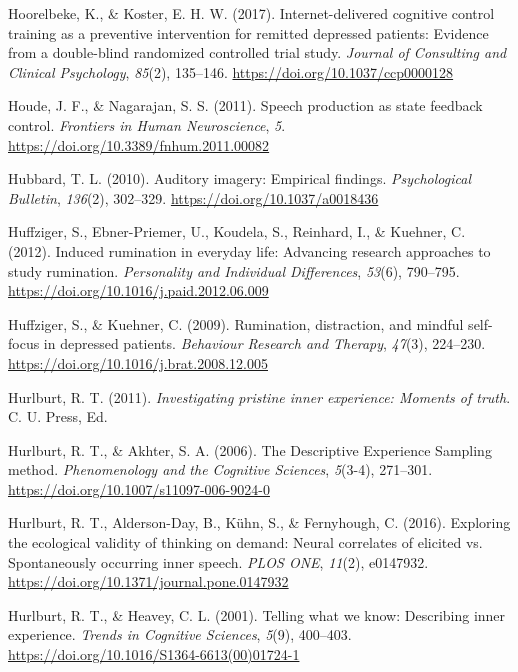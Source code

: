 \documentclass[a4paper,12pt,twoside,onecolumn,openright,final,oldfontcommands]{memoir}
\begin{document}
\leavevmode\hypertarget{ref-hoorelbeke_internet-delivered_2017}{}%
Hoorelbeke, K., \& Koster, E. H. W. (2017). Internet-delivered cognitive control training as a preventive intervention for remitted depressed patients: Evidence from a double-blind randomized controlled trial study. \emph{Journal of Consulting and Clinical Psychology}, \emph{85}(2), 135--146. \url{https://doi.org/10.1037/ccp0000128}

\leavevmode\hypertarget{ref-houde_speech_2011}{}%
Houde, J. F., \& Nagarajan, S. S. (2011). Speech production as state feedback control. \emph{Frontiers in Human Neuroscience}, \emph{5}. \url{https://doi.org/10.3389/fnhum.2011.00082}

\leavevmode\hypertarget{ref-hubbard_auditory_2010}{}%
Hubbard, T. L. (2010). Auditory imagery: Empirical findings. \emph{Psychological Bulletin}, \emph{136}(2), 302--329. \url{https://doi.org/10.1037/a0018436}

\leavevmode\hypertarget{ref-Huffziger2012}{}%
Huffziger, S., Ebner-Priemer, U., Koudela, S., Reinhard, I., \& Kuehner, C. (2012). Induced rumination in everyday life: Advancing research approaches to study rumination. \emph{Personality and Individual Differences}, \emph{53}(6), 790--795. \url{https://doi.org/10.1016/j.paid.2012.06.009}

\leavevmode\hypertarget{ref-Huffziger2009}{}%
Huffziger, S., \& Kuehner, C. (2009). Rumination, distraction, and mindful self-focus in depressed patients. \emph{Behaviour Research and Therapy}, \emph{47}(3), 224--230. \url{https://doi.org/10.1016/j.brat.2008.12.005}

\leavevmode\hypertarget{ref-Hurlburt2011}{}%
Hurlburt, R. T. (2011). \emph{Investigating pristine inner experience: Moments of truth}. C. U. Press, Ed.

\leavevmode\hypertarget{ref-hurlburt_descriptive_2006}{}%
Hurlburt, R. T., \& Akhter, S. A. (2006). The Descriptive Experience Sampling method. \emph{Phenomenology and the Cognitive Sciences}, \emph{5}(3-4), 271--301. \url{https://doi.org/10.1007/s11097-006-9024-0}

\leavevmode\hypertarget{ref-hurlburt_exploring_2016}{}%
Hurlburt, R. T., Alderson-Day, B., Kühn, S., \& Fernyhough, C. (2016). Exploring the ecological validity of thinking on demand: Neural correlates of elicited vs. Spontaneously occurring inner speech. \emph{PLOS ONE}, \emph{11}(2), e0147932. \url{https://doi.org/10.1371/journal.pone.0147932}

\leavevmode\hypertarget{ref-Hurlburt2001}{}%
Hurlburt, R. T., \& Heavey, C. L. (2001). Telling what we know: Describing inner experience. \emph{Trends in Cognitive Sciences}, \emph{5}(9), 400--403. \url{https://doi.org/10.1016/S1364-6613(00)01724-1}
\end{document}
